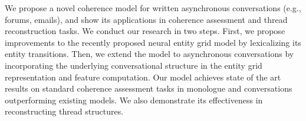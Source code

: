 We propose a novel coherence model for written asynchronous conversations (e.g., forums, emails), and show its applications in coherence assessment and thread reconstruction tasks. We conduct our research in two steps. First, we propose improvements to the recently proposed neural entity grid model by lexicalizing its entity transitions. Then, we extend the model to asynchronous conversations by incorporating the underlying conversational structure in the entity grid representation and feature computation. Our model achieves state of the art results on standard coherence assessment tasks in monologue and conversations outperforming existing models. We also demonstrate its effectiveness in reconstructing thread structures.
